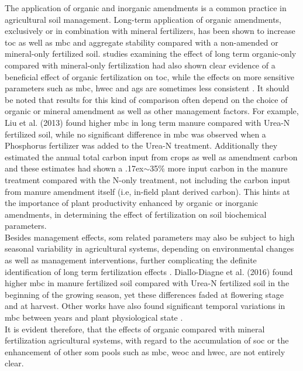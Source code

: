  		The application of organic and inorganic amendments is a common practice in agricultural soil management. Long-term application of organic amendments, exclusively or in combination with mineral fertilizers, has been shown to increase \gls{toc} \citep{heinze2010, yang2012} as well as \gls{mbc} \citep{luo2015, marschner2003a}and aggregate stability\citep{ huang2010, yu2012} compared with a non-amended or mineral-only fertilized soil.
 		studies examining the effect of long term organic-only compared with mineral-only fertilization had  also shown clear evidence of a beneficial effect of organic fertilization on \gls{toc}\citep{santos2012, luo2015}, while the effects on more sensitive parameters such as \gls{mbc}, \gls{hwec} and \gls{ags} are sometimes less consistent \citep{albiach2001, mahmood1997}. It should be noted that results for this kind of comparison often depend on the choice of organic or mineral amendment as well as other management factors.    
 		For example, Liu et al. (2013) found  higher \gls{mbc} in long term manure compared with Urea-N fertilized soil, while no significant difference in \gls{mbc} was observed when a Phosphorus fertilizer was added to the Urea-N treatment. Additionally they estimated the annual total carbon input from crops as well as amendment carbon and these estimates had shown a {\raise.17ex\hbox{$\scriptstyle\mathtt{\sim}$}}35\% more input carbon in the manure treatment compared with the N-only treatment, not including the carbon input from manure amendment itself (i.e, in-field plant derived carbon). This hints at the importance  of plant productivity enhanced by organic or inorganic amendments, in determining the  effect of fertilization on soil biochemical parameters.\\
 		Besides management effects, \gls{som}  related parameters may also be subject to high seasonal variability in agricultural systems, depending on environmental changes as well as management interventions, further complicating the definite identification of long term fertilization effects .
 		Diallo-Diagne et al. (2016) found higher \gls{mbc} in manure fertilized soil compared with Urea-N fertilized soil in the beginning of the growing season, yet these differences faded at flowering stage and at harvest. Other works have also found significant temporal variations in \gls{mbc} between years \citep{kaiser1995} and plant physiological state \citep{jat2020}.\\
		It is evident therefore, that the effects of organic compared with mineral fertilization agricultural systems, with regard to the accumulation of \gls{soc} or the enhancement of other \gls{som} pools such as \gls{mbc}, \gls{weoc} and \gls{hwec}, are not entirely clear.

